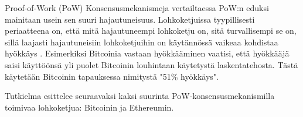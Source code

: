 \begin{section}{Proof-of-Work (PoW)\label{pow}}
Konsensusmekanismeja vertailtaessa PoW:n eduksi mainitaan usein sen suuri hajautuneisuus. Lohkoketjuissa tyypillisesti periaatteena on, että mitä hajautuneempi lohkoketju on, sitä turvallisempi se on, sillä laajasti hajautuneisiin lohkoketjuihin on käytännössä vaikeaa kohdistaa hyökkäys \cite{51attack}. Esimerkiksi Bitcoinia vastaan hyökkääminen vaatisi, että hyökkääjä saisi käyttöönsä yli puolet Bitcoinin louhintaan käytetystä laskentatehosta. Tästä käytetään Bitcoinin tapauksessa nimitystä "51\% hyökkäys".


Tutkielma esittelee seuraavaksi kaksi suurinta PoW-konsensusmekanismilla toimivaa lohkoketjua: Bitcoinin ja Ethereumin.



\end{section}